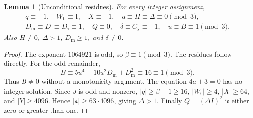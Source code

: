\documentclass[11pt,a4paper]{article}
\newtheorem{lemma}[theorem]{Lemma}
\theoremstyle{remark}\newtheorem{remark}[theorem]{Remark}
\newcommand{\Dm}{D_{\mathrm m}}\newcommand{\Df}{D_{\mathrm f}}
\newcommand{\Dt}{D_{\tau}}\newcommand{\Dg}{D_{\mathrm g}}
\newcommand{\Cc}{C_{\mathrm y}}
\begin{document}
\begin{lemma}[Unconditional residues]\label{lem:residues}
For every integer assignment,
\begin{gather*}
 q\equiv-1,\quad W_0\equiv1,\quad X\equiv-1,\quad
 a\equiv H\equiv\Delta\equiv0\pmod3,\\
 \Dm\equiv\Df\equiv\Dt\equiv1,\quad
 Q\equiv0,\quad \delta\equiv\Cc\equiv-1,\quad
 u\equiv B\equiv1\pmod3.
\end{gather*}
Also $H\ne0$, $\Delta>1$, $\Dm\ge1$, and $\delta\ne0$.
\end{lemma}
\begin{proof}
The exponent $1064921$ is odd, so $\beta\equiv1\pmod3$.
The residues follow directly. For the odd remainder,
\[
 B\equiv5u^4+10u^2\Dm+\Dm^2\equiv16\equiv1\pmod3.
\]
Thus $B\ne0$ without a monotonicity argument.
The equation $4a+3=0$ has no integer solution. Since $J$ is odd and
nonzero, $|q|\ge\beta-1\ge16$, $|W_0|\ge4$, $|X|\ge64$, and
$|Y|\ge4096$. Hence $|a|\ge63\cdot4096$, giving $\Delta>1$.
Finally $Q=(\Delta I)^2$ is either zero or greater than one.
\end{proof}




\end{document}
